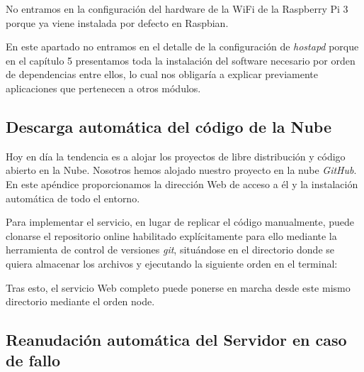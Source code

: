 \begin{appendices}
No entramos en la configuración del hardware de la WiFi de la Raspberry Pi 3 porque ya viene instalada por defecto en Raspbian.

En este apartado no entramos en el detalle de la configuración de \emph{hostapd} porque en el capítulo 5 presentamos toda la instalación del software necesario por orden de dependencias entre ellos, lo cual nos obligaría a explicar previamente aplicaciones que pertenecen a otros módulos.
\clearpage
{}%
\begin{center}
\begin{minipage}{.75\textwidth}
\section{Descarga automática del código de la Nube}\label{ApendiceB}

Hoy en día la tendencia es a alojar los proyectos de libre distribución y código abierto en la Nube. Nosotros hemos alojado nuestro proyecto en la nube \emph{GitHub}. En este apéndice proporcionamos la dirección Web de acceso a él y la instalación automática de todo el entorno.
\end{minipage}
\end{center}
\clearpage%

Para implementar el servicio, en lugar de replicar el código manualmente, puede clonarse el repositorio online habilitado explícitamente para ello mediante la herramienta de control de versiones \emph{git}, situándose en el directorio donde se quiera almacenar los archivos y ejecutando la siguiente orden en el terminal: 


Tras esto, el servicio Web completo puede ponerse en marcha desde este mismo directorio mediante el orden node.

\clearpage
{}%
\begin{center}
\begin{minipage}{.75\textwidth}

\section{Reanudación automática del Servidor en caso de fallo}\label{ApendiceC}


\end{minipage}
\end{center}
\end{appendices}
